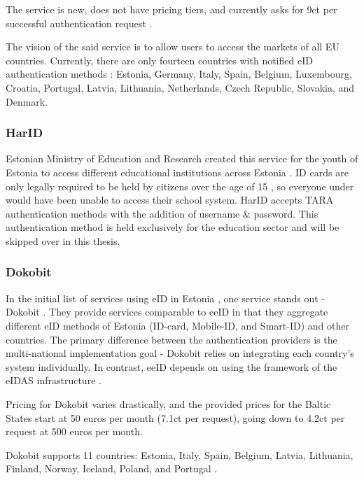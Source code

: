 The service is new, does not have pricing tiers, and currently asks for 9ct per successful authentication request \cite{eeid-pricing}.

The vision of the said service is to allow users to access the markets of all EU countries. Currently, there are only fourteen countries with notified eID authentication methods \cite{eulaw-eidas-notified}: Estonia, Germany, Italy, Spain, Belgium, Luxembourg, Croatia, Portugal, Latvia, Lithuania, Netherlands, Czech Republic, Slovakia, and Denmark.

\subsubsection{HarID}

Estonian Ministry of Education and Research created this service for the youth of Estonia to access different educational institutions across Estonia \cite{harid}. ID cards are only legally required to be held by citizens over the age of 15 \cite{eelaw-idcard}, so everyone under would have been unable to access their school system. HarID accepts TARA authentication methods with the addition of username \& password. This authentication method is held exclusively for the education sector and will be skipped over in this thesis.

\subsubsection{Dokobit}

In the initial list of services using eID in Estonia \cite{ut-eidinestonia}, one service stands out - Dokobit \cite{dokobit}. They provide services comparable to eeID in that they aggregate different eID methods of Estonia (ID-card, Mobile-ID, and Smart-ID) and other countries. The primary difference between the authentication providers is the multi-national implementation goal - Dokobit relies on integrating each country's system individually. In contrast, eeID depends on using the framework of the eIDAS infrastructure \cite{eeid}.

Pricing for Dokobit varies drastically, and the provided prices for the Baltic States \cite{dokobit-pricing} start at 50 euros per month (7.1ct per request), going down to 4.2ct per request at 500 euros per month.

Dokobit supports 11 countries: Estonia, Italy, Spain, Belgium, Latvia, Lithuania, Finland, Norway, Iceland, Poland, and Portugal \cite{dokobit}.

